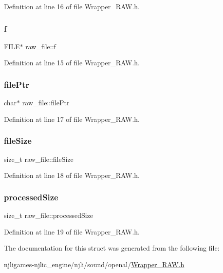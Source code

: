 Definition at line 16 of file Wrapper\+\_\+\+R\+A\+W.\+h.

\mbox{\label{structraw__file_ac211dbcdb304fa78dc231c939233ca48}} 
\subsubsection{\texorpdfstring{f}{f}}
{\footnotesize\ttfamily F\+I\+LE$\ast$ raw\+\_\+file\+::f}



Definition at line 15 of file Wrapper\+\_\+\+R\+A\+W.\+h.

\mbox{\label{structraw__file_a426ecbe92162fd69a119b7d3d5a299a4}} 
\subsubsection{\texorpdfstring{file\+Ptr}{filePtr}}
{\footnotesize\ttfamily char$\ast$ raw\+\_\+file\+::file\+Ptr}



Definition at line 17 of file Wrapper\+\_\+\+R\+A\+W.\+h.

\mbox{\label{structraw__file_ac3744b3c64b2b9d16e5f709c384e9132}} 
\subsubsection{\texorpdfstring{file\+Size}{fileSize}}
{\footnotesize\ttfamily size\+\_\+t raw\+\_\+file\+::file\+Size}



Definition at line 18 of file Wrapper\+\_\+\+R\+A\+W.\+h.

\mbox{\label{structraw__file_ac7ea6a97f86f1d5dcf21a542d596e6ae}} 
\subsubsection{\texorpdfstring{processed\+Size}{processedSize}}
{\footnotesize\ttfamily size\+\_\+t raw\+\_\+file\+::processed\+Size}



Definition at line 19 of file Wrapper\+\_\+\+R\+A\+W.\+h.



The documentation for this struct was generated from the following file\+:\begin{DoxyCompactItemize}
\item 
njligames-\/njlic\+\_\+engine/njli/sound/openal/\mbox{\hyperlink{_wrapper___r_a_w_8h}{Wrapper\+\_\+\+R\+A\+W.\+h}}\end{DoxyCompactItemize}
